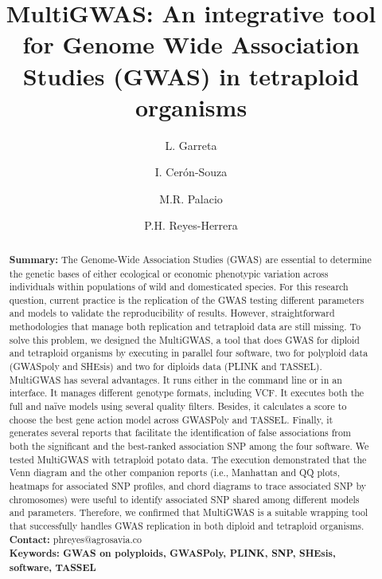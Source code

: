 \documentclass{article}
\begin{document}
\title{MultiGWAS: An integrative tool for Genome Wide Association Studies (GWAS) in tetraploid organisms}

\author[1]{L. Garreta}
\author[1]{I. Cer\'{o}n-Souza}
\author[2]{M.R. Palacio}
\author[1]{P.H. Reyes-Herrera}




\maketitle

\begin{abstract}
\textbf{Summary:} The Genome-Wide Association Studies (GWAS) are essential to determine the genetic bases of either ecological or economic phenotypic variation across individuals within populations of wild and domesticated species. For this research question, current practice is the replication of the GWAS testing different parameters and models to validate the reproducibility of results. However, straightforward methodologies that manage both replication and tetraploid data are still missing. To solve this problem, we designed the MultiGWAS, a tool that does GWAS for diploid and tetraploid organisms by executing in parallel four software, two for polyploid data (GWASpoly and SHEsis) and two for diploids data (PLINK and TASSEL). MultiGWAS has several advantages. It runs either in the command line or in an interface. It manages different genotype formats, including VCF. It executes both the full and naïve models using several quality filters. Besides, it calculates a score to choose the best gene action model across GWASPoly and TASSEL. Finally, it generates several reports that facilitate the identification of false associations from both the significant and the best-ranked association SNP among the four software. We tested MultiGWAS with tetraploid potato data. The execution demonstrated that the Venn diagram and the other companion reports (i.e., Manhattan and QQ plots, heatmaps for associated SNP profiles, and chord diagrams to trace associated SNP by chromosomes) were useful to identify associated SNP shared among different models and parameters. Therefore, we confirmed that MultiGWAS is a suitable wrapping tool that successfully handles GWAS replication in both diploid and tetraploid organisms. \\
\textbf{Contact:} phreyes@agrosavia.co\\
\textbf{Keywords: GWAS on polyploids, GWASPoly, PLINK, SNP, SHEsis, software, TASSEL}
\end{abstract}
\end{document}
